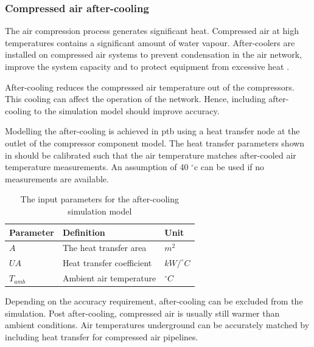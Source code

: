 		\subsubsection{Compressed air after-cooling}
		The air compression process generates significant heat. Compressed air at high temperatures contains a significant amount of water vapour. After-coolers are installed on compressed air systems to prevent condensation in the air network, improve the system capacity and to protect equipment from excessive heat \cite{schroeder2009energy}.
		\par 
		After-cooling reduces the compressed air temperature out of the compressors. This cooling can affect the operation of the network. Hence, including after-cooling to the simulation model should improve accuracy.
		\par
		Modelling the after-cooling is achieved in \gls{ptb} using a heat transfer node at the outlet of the compressor component model. The heat transfer parameters shown in  should be calibrated such that the air temperature matches after-cooled air temperature measurements. An assumption of 40 $^\circ$\gls{c} can be used if no measurements are available.
		\begin{table}
			\centering
			\begin{tabular}{lll}
				\hline 
				Parameter \hspace{1cm} & Definition \hspace{4cm} & Unit \\
				\hline
				$A$ & The heat transfer area & $m^2$ \\
				$UA$ & Heat transfer coefficient & $kW/^{\circ} C$ \\
				$T_{amb}$ & Ambient air temperature & $^{\circ} C$ \\
				\hline
			\end{tabular}
		\caption{The input parameters for the after-cooling simulation model}
		\label{table: After cooling inputs}
		\end{table}
	Depending on the accuracy requirement, after-cooling can be excluded from the simulation. Post after-cooling, compressed air is usually still warmer than ambient conditions. Air temperatures underground can be accurately matched by including heat transfer for compressed air pipelines.
	
